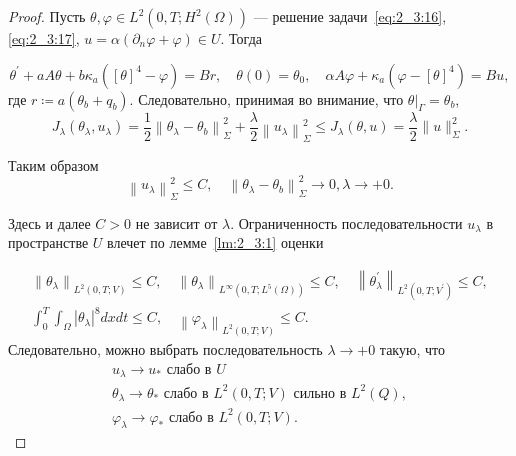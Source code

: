 \begin{proof}
    Пусть $\theta, \varphi \in L^{2}\left(0, T ; H^{2}(\Omega)\right)$
    — решение задачи~\eqref{eq:2_3:16},\eqref{eq:2_3:17},
    $u=\alpha\left(\partial_{n} \varphi+\varphi\right) \in U$.
    Тогда

    \[
        \theta^{\prime}+a A \theta+b \kappa_{a}\left([\theta]^{4}-\varphi\right)=B r,
        \quad \theta(0)=\theta_{0}, \quad \alpha A \varphi
        + \kappa_{a}\left(\varphi-[\theta]^{4}\right)=B u,
    \]
    где $r\coloneqq a\left(\theta_{b}+q_{b}\right)$.
    Следовательно, принимая во внимание,
    что $\left.\theta\right|_{\Gamma}=\theta_{b}$,
    \[
        J_{\lambda}\left(\theta_{\lambda},
        u_{\lambda}\right)=\frac{1}{2}\left\|\theta_{\lambda}-\theta_{b}\right\|_{\Sigma}^{2}
        +\frac{\lambda}{2}\left\|u_{\lambda}\right\|_{\Sigma}^{2}
        \leq J_{\lambda}(\theta, u)=\frac{\lambda}{2}\|u\|_{\Sigma}^{2}.
    \]

    Таким образом
    \[
        \left\|u_{\lambda}\right\|_{\Sigma}^{2} \leq C, \quad\left\|\theta_{\lambda}
        -\theta_{b}\right\|_{\Sigma}^{2} \rightarrow 0, \lambda \rightarrow+0.
    \]


    Здесь и далее $C>0$ не зависит от $\lambda$.
    Ограниченность последовательности $u_{\lambda}$
    в пространстве $U$ влечет по лемме~\ref{lm:2_3:1} оценки

    \[
        \begin{gathered}
            \left\|\theta_{\lambda}\right\|_{L^{2}(0, T ; V)} \leq C,
            \quad\left\|\theta_{\lambda}\right\|_{L^{\infty}
            \left(0, T ; L^{5}(\Omega)\right)} \leq C,
            \quad\left\|\theta_{\lambda}^{\prime}\right\|_{L^{2}
            \left(0, T ; V^{\prime}\right)} \leq C, \\
            \int_{0}^{T} \int_{\Omega}
            \left|\theta_{\lambda}\right|^{8} d x d t \leq C,
            \quad\left\|\varphi_{\lambda}\right\|_{L^{2}(0, T ; V)} \leq C.
        \end{gathered}
    \]
    Следовательно, можно выбрать последовательность $\lambda\rightarrow+0$ такую, что
    \[
        \begin{gathered}
            u_{\lambda} \rightarrow u_{*} \text { слабо в } U \\
            \theta_{\lambda} \rightarrow \theta_{*}
            \text { слабо в } L^{2}(0, T; V) \text { сильно в } L^{2}(Q), \\
            \varphi_{\lambda} \rightarrow \varphi_{*}
            \text { слабо в } L^{2}(0, T; V).
        \end{gathered}
    \]


\end{proof}
